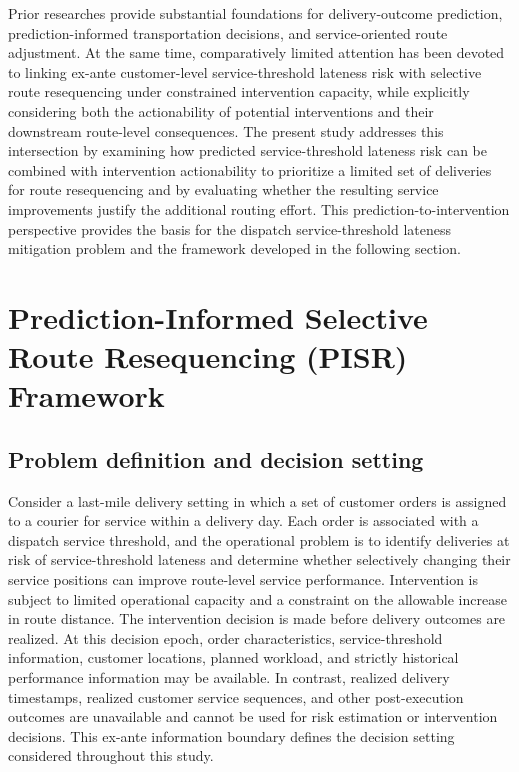 \documentclass[11pt,a4paper]{article}
\begin{document}
Prior researches provide substantial foundations for delivery-outcome
prediction, prediction-informed transportation decisions, and
service-oriented route adjustment. At the same time, comparatively
limited attention has been devoted to linking ex-ante customer-level
service-threshold lateness risk with selective route resequencing under
constrained intervention capacity, while explicitly considering both the
actionability of potential interventions and their downstream
route-level consequences. The present study addresses this intersection
by examining how predicted service-threshold lateness risk can be combined
with intervention actionability to prioritize a limited set of
deliveries for route resequencing and by evaluating whether the
resulting service improvements justify the additional routing effort.
This prediction-to-intervention perspective provides the basis for the
dispatch service-threshold lateness mitigation problem and the framework
developed in the following section.

\section{Prediction-Informed Selective Route Resequencing (PISR) Framework}\label{sec:pisr-framework}

\subsection{Problem definition and decision setting}\label{sec:problem-definition}

Consider a last-mile delivery setting in which a set of customer orders
is assigned to a courier for service within a delivery day. Each order
is associated with a dispatch service threshold, and the operational problem
is to identify deliveries at risk of service-threshold lateness and
determine whether selectively changing their service positions can
improve route-level service performance. Intervention is subject to
limited operational capacity and a constraint on the allowable increase
in route distance. The intervention decision is made before delivery
outcomes are realized. At this decision epoch, order characteristics,
service-threshold information, customer locations, planned workload, and
strictly historical performance information may be available. In
contrast, realized delivery timestamps, realized customer service
sequences, and other post-execution outcomes are unavailable and cannot
be used for risk estimation or intervention decisions. This ex-ante
information boundary defines the decision setting considered throughout
this study.
\end{document}
